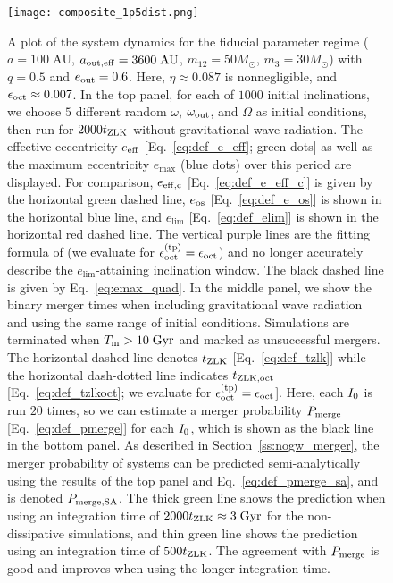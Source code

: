 \documentclass[
        fleqn,
        usenatbib,
    ]{mnras}
\newlength{\colummwidth}
\begin{document}
\begin{figure}
    \centering
    \texttt{[image: composite\_1p5dist.png]}
    \caption{A plot of the system dynamics for the fiducial parameter regime ($a
    = 100\;\mathrm{AU}$, $a_{\rm out, eff} = 3600\;\mathrm{AU}$, $m_{12} =
    50M_{\odot}$, $m_3 = 30M_{\odot}$) with $q = 0.5$ and $e_{\rm out} = 0.6$.
    Here, $\eta \approx 0.087$ is nonnegligible, and $\epsilon_{\rm oct} \approx
    0.007$. In the top panel, for each of $1000$ initial inclinations, we choose
    $5$ different random $\omega$, $\omega_{\rm out}$, and $\Omega$ as initial
    conditions, then run for $2000t_{\rm ZLK}$ without gravitational wave
    radiation. The effective eccentricity $e_{\rm eff}$
    [Eq.~\eqref{eq:def_e_eff}; green dots] as well as the maximum eccentricity
    $e_{\max}$ (blue dots) over this period are displayed. For comparison,
    $e_{\rm eff, c}$ [Eq.~\eqref{eq:def_e_eff_c}] is given by the horizontal
    green dashed line, $e_{\rm os}$ [Eq.~\eqref{eq:def_e_os}] is shown in the
    horizontal blue line, and $e_{\lim}$ [Eq.~\eqref{eq:def_elim}] is shown in
    the horizontal red dashed line. The vertical purple lines are the fitting
    formula of \citet{MLL16} (we evaluate for $\epsilon_{\rm oct}^{\rm (tp)} =
    \epsilon_{\rm oct}$) and no longer accurately describe the
    $e_{\lim}$-attaining inclination window. The black dashed line is given by
    Eq.~\eqref{eq:emax_quad}. In the middle panel, we show the binary merger
    times when including gravitational wave radiation and using the same range
    of initial conditions. Simulations are terminated when $T_{\rm m} >
    10\;\mathrm{Gyr}$ and marked as unsuccessful mergers. The horizontal dashed
    line denotes $t_{\rm ZLK}$ [Eq.~\eqref{eq:def_tzlk}] while the horizontal
    dash-dotted line indicates $t_{\rm ZLK, oct}$ [Eq.~\eqref{eq:def_tzlkoct};
    we evaluate for $\epsilon_{\rm oct}^{\rm (tp)} = \epsilon_{\rm oct}$]. Here,
    each $I_{\rm 0}$ is run $20$ times, so we can estimate a merger probability
    $P_{\rm merge}$ [Eq.~\eqref{eq:def_pmerge}] for each $I_{\rm 0}$, which is
    shown as the black line in the bottom panel. As described in
    Section~\ref{ss:nogw_merger}, the merger probability of systems can be
    predicted semi-analytically using the results of the top panel and
    Eq.~\eqref{eq:def_pmerge_sa}, and is denoted $P_{\rm merge, SA}$. The thick
    green line shows the prediction when using an integration time of
    $2000 t_{\rm ZLK} \approx 3\;\mathrm{Gyr}$ for the non-dissipative
    simulations, and thin green line shows the prediction using an integration
    time of $500 t_{\rm ZLK}$. The agreement with $P_{\rm merge}$ is good and
    improves when using the longer integration time.
    }\label{fig:composite_dist}
\end{figure}
\end{document}
